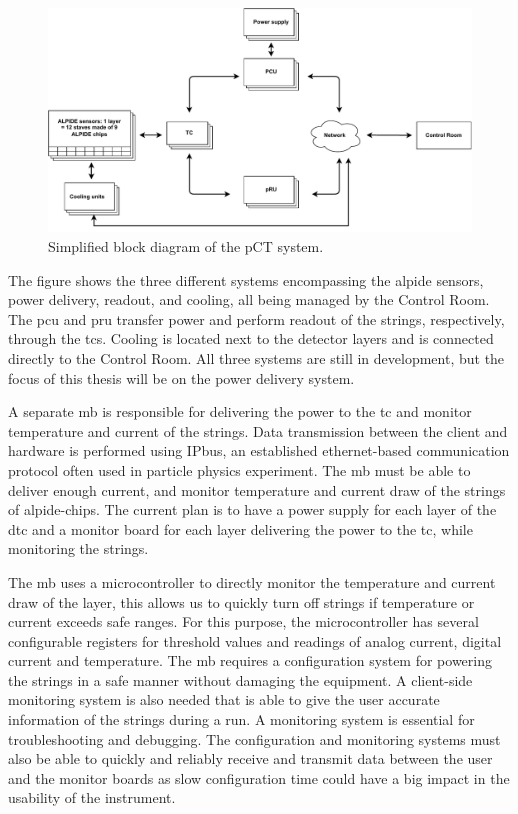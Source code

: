\documentclass[main.tex]{subfiles}
\begin{document}
\begin{figure}[!htpb]
    \centering
    \includegraphics[scale = 0.65]{images/dcs_concept_renewed.pdf}
    \caption{Simplified block diagram of the pCT system.}
    \label{fig: dcs_renewed}
\end{figure}
\FloatBarrier

The figure shows the three different systems encompassing the \gls{alpide} sensors, power delivery, readout, and cooling, all being managed by the Control Room. The \gls{pcu} and \gls{pru} transfer power and perform readout of the strings, respectively, through the \gls{tc}s. Cooling is located next to the detector layers and is connected directly to the Control Room. All three systems are still in development, but the focus of this thesis will be on the power delivery system.

A separate \gls{mb} is responsible for delivering the power to the \gls{tc} and monitor temperature and current of the strings. Data transmission between the client and hardware is performed using IPbus, an established ethernet-based communication protocol often used in particle physics experiment. The \gls{mb} must be able to deliver enough current, and monitor temperature and current draw of the strings of \gls{alpide}-chips. The current plan is to have a power supply for each layer of the \gls{dtc} and a monitor board for each layer delivering the power to the \gls{tc}, while monitoring the strings. \par

The \gls{mb} uses a microcontroller to directly monitor the temperature and current draw of the layer, this allows us to quickly turn off strings if temperature or current exceeds safe ranges. For this purpose, the microcontroller has several configurable registers for threshold values and readings of analog current, digital current and temperature. The \gls{mb} requires a configuration system for powering the strings in a safe manner without damaging the equipment. A client-side monitoring system is also needed that is able to give the user accurate information of the strings during a run. A monitoring system is essential for troubleshooting and debugging. The configuration and monitoring systems must also be able to quickly and reliably receive and transmit data between the user and the monitor boards as slow configuration time could have a big impact in the usability of the instrument.
\end{document}
